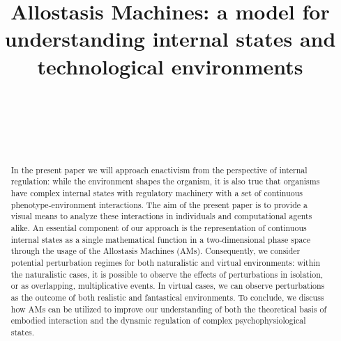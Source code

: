 \documentclass{sigchi}
\def\plaintitle{Allostasis Machines: a model for understanding internal states and technological environments}
\begin{document}
\title{\plaintitle}

\author{%
  \\
  \\
  \\
    \\
}

\maketitle

\begin{abstract}
In the present paper we will approach enactivism from the perspective of internal regulation: while the environment shapes the organism, it is also true that organisms have complex internal states with regulatory machinery with a set of continuous phenotype-environment interactions. The aim of the present paper is to provide a visual means to analyze these interactions in individuals and computational agents alike. An essential component of our approach is the representation of continuous internal states as a single mathematical function in a two-dimensional phase space through the usage of the Allostasis Machines (AMs). Consequently, we consider potential perturbation regimes for both naturalistic and virtual environments: within the naturalistic cases, it is possible to observe the effects of perturbations in isolation, or as overlapping, multiplicative events. In virtual cases, we can observe perturbations as the outcome of both realistic and fantastical environments. To conclude, we discuss how AMs can be utilized to improve our understanding of both the theoretical basis of embodied interaction and the dynamic regulation of complex psychophysiological states.
\end{abstract}
\end{document}
